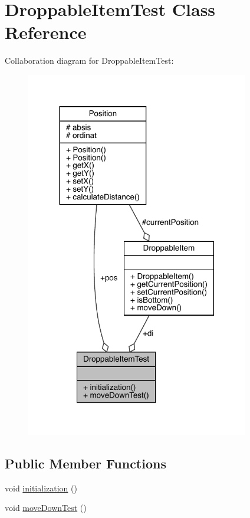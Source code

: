 \hypertarget{class_droppable_item_test}{}\section{Droppable\+Item\+Test Class Reference}
\label{class_droppable_item_test}


Collaboration diagram for Droppable\+Item\+Test\+:
\nopagebreak
\begin{figure}[H]
\begin{center}
\leavevmode
\includegraphics[width=276pt]{class_droppable_item_test__coll__graph}
\end{center}
\end{figure}
\subsection*{Public Member Functions}
\begin{DoxyCompactItemize}
\item 
void \mbox{\hyperlink{class_droppable_item_test_a21fe6227c90bc306be2cc17a857d6120}{initialization}} ()
\item 
void \mbox{\hyperlink{class_droppable_item_test_a6cf1fa022a5a09f02c6674dc66db4efb}{move\+Down\+Test}} ()
\end{DoxyCompactItemize}
